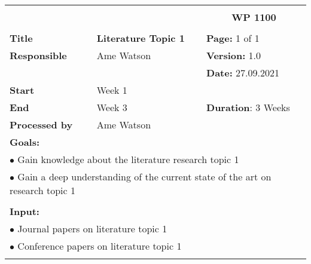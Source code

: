 \newcommand{\wpddate}{27.09.2021}

\begin{table}[!h]
    \begin{center}
        \begin{tabular}{|p{}||p{}|p{}||p{}|}
            \hline
            \multicolumn{3}{|l||}{\textbf{}} & \multicolumn{1}{c|}{}\\
            \multicolumn{3}{|l||}{\textbf{}} & \multicolumn{1}{c|}{\textbf{WP 1100}}\\
            \multicolumn{3}{|l||}{\textbf{}} & \multicolumn{1}{c|}{}\\
            \hline\hline
            \textbf{Title} & \multicolumn{2}{p{.40\columnwidth}||}{\textbf{Literature Topic 1}}
            & \textbf{Page:} 1 of 1\\
            \hline
            \textbf{Responsible} & \multicolumn{2}{l||}{Ame Watson} & \textbf{Version:} 1.0\\
            \hline
            \multicolumn{3}{|l||}{} & \textbf{Date:} \wpddate\\
            \hline\hline
            \textbf{Start} & \multicolumn{2}{l||}{Week 1} & \\
            \hline
            \textbf{End} & \multicolumn{2}{l||}{Week 3} & \textbf{Duration}: 3 Weeks\\
            \hline\hline
            \textbf{Processed by} & \multicolumn{3}{l|}{Ame Watson}\\
            \hline\hline
            \multicolumn{4}{|p{.95\columnwidth}|}{\textbf{Goals:}}\\
            \multicolumn{4}{|p{.95\columnwidth}|}{$\bullet$ Gain knowledge about the literature research topic 1}\\
            \multicolumn{4}{|p{.95\columnwidth}|}{$\bullet$ Gain a deep understanding of the current state of the art on research topic 1}\\
            \multicolumn{4}{|p{.95\columnwidth}|}{}\\
            \multicolumn{4}{|p{.95\columnwidth}|}{\textbf{Input:}}\\
            \multicolumn{4}{|p{.95\columnwidth}|}{$\bullet$ Journal papers on literature topic 1}\\
            \multicolumn{4}{|p{.95\columnwidth}|}{$\bullet$ Conference papers on literature topic 1}\\
            \multicolumn{4}{|p{.95\columnwidth}|}{}\\

\end{tabular}
\end{center}
\end{table}

